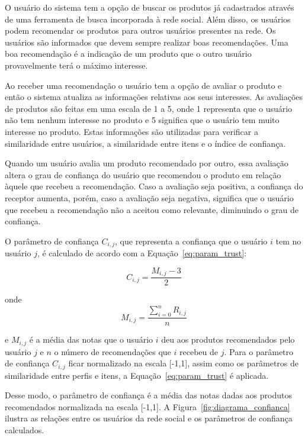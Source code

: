   O usuário do sistema tem a opção de buscar os produtos já cadastrados através de uma ferramenta de busca incorporada à rede social. Além disso, os usuários podem recomendar os produtos para outros usuários presentes na rede. Os usuários são informados que devem sempre realizar boas recomendações. Uma boa recomendação é a indicação de um produto que o outro usuário provavelmente terá o máximo interesse.

 Ao receber uma recomendação o usuário tem a opção de avaliar o produto e então o sistema atualiza as informações relativas aos seus interesses. As avaliações de produtos são feitas em uma escala de 1 a 5, onde 1 representa que o usuário não tem nenhum interesse no produto e 5 significa que o usuário tem muito interesse no produto. Estas informações são utilizadas para verificar a similaridade entre usuários, a similaridade entre itens e o índice de confiança.
 
 Quando um usuário avalia um produto recomendado por outro, essa avaliação altera o grau de confiança do usuário que recomendou o produto em relação àquele que recebeu a recomendação. Caso a avaliação seja positiva, a confiança do receptor aumenta, porém, caso a avaliação seja negativa, significa que o usuário que recebeu a recomendação não a aceitou como relevante, diminuindo o grau de confiança.

 O parâmetro de confiança $C_{i,j}$, que representa a confiança que o usuário $i$ tem no usuário $j$, é calculado de acordo com a Equação~\ref{eq:param_trust}:
 
\begin{equation}
 C_{i,j} = \frac{M_{i,j} - 3}{2}
 \label{eq:param_trust} 
\end{equation}

 onde
\begin{equation}
 M_{i,j} = \frac{{\sum_{i=0}^n}R_{i,j}}{n}
 \label{eq:media_notas}
\end{equation}

 e $M_{i,j}$ é a média das notas que o usuário $i$ deu aos produtos recomendados pelo usuário $j$ e $n$ o número de recomendações que $i$ recebeu de $j$. Para o parâmetro de confiança $C_{i,j}$ ficar normalizado na escala [-1,1], assim como os parâmetros de similaridade entre perfis e itens, a Equação~\ref{eq:param_trust} é aplicada.

 Desse modo, o parâmetro de confiança é a média das notas dadas aos produtos recomendados normalizada na escala [-1,1]. A Figura~\ref{fig:diagrama_confianca} ilustra as relações entre os usuários da rede social e os parâmetros de confiança calculados.
 
